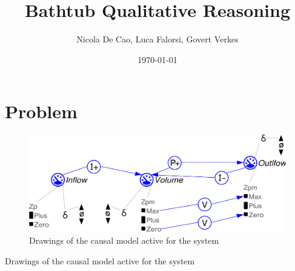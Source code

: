 \documentclass[a4paper]{article}
\title{Bathtub Qualitative Reasoning}
\author{Nicola De Cao, Luca Falorsi, Govert Verkes}
\date{\today}
\begin{document}
\maketitle

\section{Problem}
	
\begin{figure}[H]
\includegraphics[]{problem.png}
\caption{Drawings of the causal model active for the system}
\end{figure}

\begin{algorithm}
\caption{Drawings of the causal model active for the system}
\end{algorithm}
\end{document}
